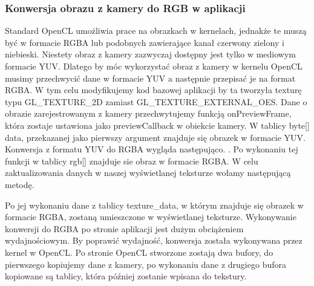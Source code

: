 \subsubsection[Konwersja obrazu z kamery do RGB w aplikacji]{Konwersja obrazu z kamery do RGB w aplikacji}
Standard OpenCL umożliwia prace na obrazkach w kernelach, jednakże te muszą być w formacie RGBA lub podobnych zawierające kanał czerwony zielony i niebieski. Niestety obraz z kamery zazwyczaj dostępny jest tylko w mediowym formacie YUV. Dlatego by móc wykorzystać obraz z kamery w kernelu OpenCL musimy przechwycić dane w formacie YUV a następnie przepisać je na format RGBA. W tym celu modyfikujemy kod bazowej aplikacji by ta tworzyła texturę typu GL\_TEXTURE\_2D zamiast GL\_TEXTURE\_EXTERNAL\_OES. Dane o obrazie zarejestrowanym z kamery przechwytujemy funkcją onPreviewFrame, która zostaje ustawiona jako previewCallback w obiekcie kamery. W tablicy byte[] data, przekazanej jako pierwszy argument znajduje się obrazek w formacie YUV. Konwersja z formatu YUV do RGBA wygląda następująco.
. Po wykonaniu tej funkcji w tablicy rgb[] znajduje sie obraz w formacie RGBA. W celu zaktualizowania danych w naszej wyświetlanej teksturze wołamy następującą metodę. 

Po jej wykonaniu dane z tablicy texture\_data, w którym znajduje się obrazek w formacie RGBA, zostaną umieszczone w wyświetlanej teksturze.
Wykonywanie konwersji do RGBA po stronie aplikacji jest dużym obciążeniem wydajnościowym. By poprawić wydajność, konwersja została wykonywana przez kernel w OpenCL. Po stronie OpenCL stworzone zostają dwa bufory, do pierwszego kopiujemy dane z kamery, po wykonaniu dane z drugiego bufora kopiowane są tablicy, która później zostanie wpisana do tekstury.

